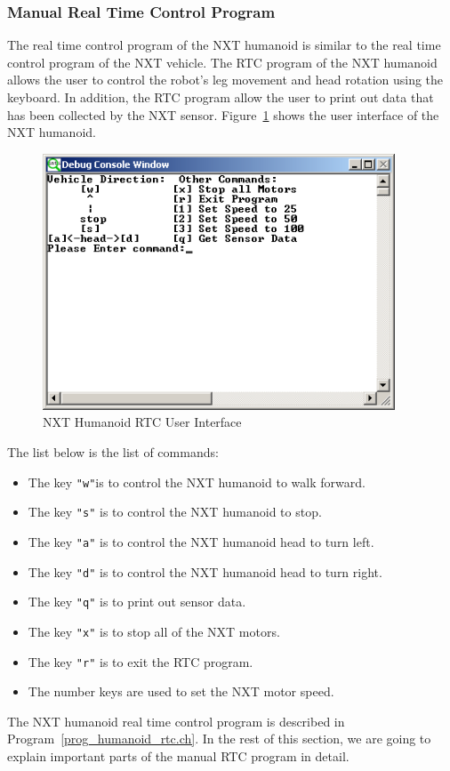 \documentclass[11pt]{article}
\begin{document}
\newpage
\subsubsection{Manual Real Time Control Program}
The real time control program of the NXT humanoid is similar to the real time 
control program of the NXT vehicle. The RTC program of the NXT humanoid allows 
the user to control the robot's leg movement and head rotation using the 
keyboard. In addition, the RTC program allow the user to print out data that 
has been collected by the NXT sensor. Figure~\ref{fig_human_UI} shows the user 
interface of the NXT humanoid.
\begin{figure}[ht]
  \begin{center}
    \includegraphics[height=3in]{figure/mindstorm/human_UI.png}
    \caption{NXT Humanoid RTC User Interface \label{fig_human_UI}}
  \end{center}
\end{figure}
The list below is the list of commands:
\begin{itemize}
    \item The key {\tt "w"}is to control the NXT humanoid to walk forward.
\item The key {\tt "s"} is to control the NXT humanoid to stop.
\item The key {\tt "a"} is to control the NXT humanoid head to turn left.
\item The key {\tt "d"} is to control the NXT humanoid head to turn right.
\item The key {\tt "q"} is to print out sensor data.
\item The key {\tt "x"} is to stop all of the NXT motors.
\item The key {\tt "r"} is to exit the RTC program.
\item The number keys are used to set the NXT motor speed.
\end{itemize}
The NXT humanoid real time control program is described in 
Program~\ref{prog_humanoid_rtc.ch}. In the rest of this section, we are going 
to explain important parts of the manual RTC program in detail.
\end{document}

